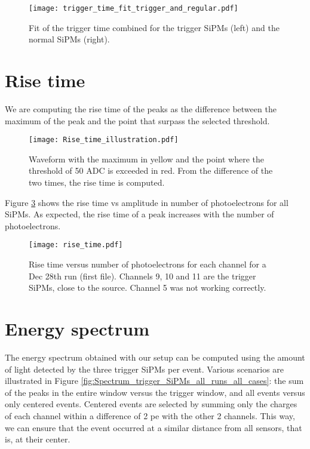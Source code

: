 \documentclass[11pt,a4paper,english,oneside, pdf]{article}
\begin{document}
	\begin{figure}[!h]
		\begin{center}
			\texttt{[image: trigger\_time\_fit\_trigger\_and\_regular.pdf]}
			\caption{Fit of the trigger time combined for the trigger SiPMs (left) and the normal SiPMs (right).}
			\label{fig:trigger_time_fit_trigger_and_regular}
		\end{center}
	\end{figure}
	
	
	\section{Rise time}
	
	We are computing the rise time of the peaks as the difference between the maximum of the peak and the point that surpass the selected threshold.
	
	\begin{figure}[!h]
		\begin{center}
			\texttt{[image: Rise\_time\_illustration.pdf]}
			\caption{Waveform with the maximum in yellow and the point where the threshold of 50 ADC is exceeded in red. From the difference of the two times, the rise time is computed.}
			\label{fig:Rise_time_illustration}
		\end{center}
	\end{figure}
	
	Figure \ref{fig:rise_time} shows the rise time vs amplitude in number of photoelectrons for all SiPMs. As expected, the rise time of a peak increases with the number of photoelectrons.
	
	\begin{figure}[!h]
		\begin{center}
			\texttt{[image: rise\_time.pdf]}
			\caption{Rise time versus number of photoelectrons for each channel for a Dec 28th run (first file). Channels 9, 10 and 11 are the trigger SiPMs, close to the source. Channel 5 was not working correctly.}
			\label{fig:rise_time}
		\end{center}
	\end{figure}
	
	\section{Energy spectrum}
	
	The energy spectrum obtained with our setup can be computed using the amount of light detected by the three trigger SiPMs per event. Various scenarios are illustrated in Figure \ref{fig:Spectrum_trigger_SiPMs_all_runs_all_cases}: the sum of the peaks in the entire window versus the trigger window, and all events versus only centered events. Centered events are selected by summing only the charges of each channel within a difference of 2 pe with the other 2 channels. This way, we can ensure that the event occurred at a similar distance from all sensors, that is, at their center.
	
\end{document}
